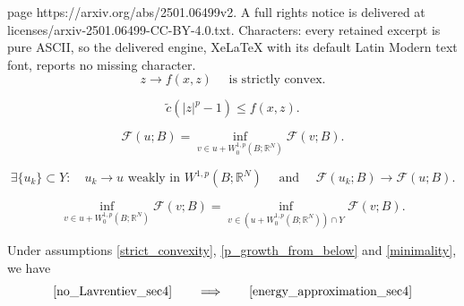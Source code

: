 \documentclass[10pt,a4paper]{amsart}
\begin{document}
page https://arxiv.org/abs/2501.06499v2. A full rights notice is delivered at licenses/arxiv-2501.06499-CC-BY-4.0.txt. Characters: every retained excerpt is pure ASCII, so the delivered engine, XeLaTeX with its default Latin Modern text font, reports no missing character.
 \begin{equation}
     \label{strict_convexity}
     z \to f(x,z) \quad \text{ is strictly convex.}
 \end{equation}

 \begin{equation}
     \label{p_growth_from_below}
    \tilde{c} (|z|^p - 1) \leq f(x,z).
 \end{equation}

\begin{equation}
     \label{minimality}
    \mathcal{F}(u;B) = \inf_{v \in u + W^{1,p}_0(B;\mathbb{R}^N)} \mathcal{F}(v;B).
 \end{equation}

\begin{equation}
    \label{energy_approximation_sec4}
    \exists \{u_k\} \subset Y: \quad u_k \to u \text{ weakly in } W^{1,p}(B;\mathbb{R}^N) \quad \text{ and } \quad \mathcal{F}(u_k;B) \to \mathcal{F}(u;B).
\end{equation}

\begin{equation}
    \label{no_Lavrentiev_sec4}
    \inf_{v \in u + W^{1,p}_0(B;\mathbb{R}^N)} \mathcal{F}(v;B) =
    \inf_{v \in (u + W^{1,p}_0(B;\mathbb{R}^N)) \cap Y} \mathcal{F}(v;B).
\end{equation}

\begin{thm}
\label{absence_of_Lavrentiev} 
Under assumptions \eqref{strict_convexity}, \eqref{p_growth_from_below} and \eqref{minimality}, we have
\begin{equation}
    \label{no_Lav_implies_en_approx}
    \eqref{no_Lavrentiev_sec4}
    \qquad
    \Longrightarrow
    \qquad\eqref{energy_approximation_sec4}
\end{equation}
\end{thm}
\end{document}
